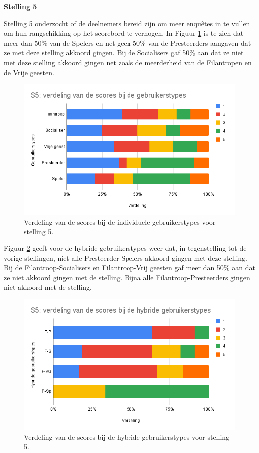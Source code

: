 \textbf{Stelling 5}

Stelling 5 onderzocht of de deelnemers bereid zijn om meer enquêtes in te vullen om hun rangschikking op het scorebord te verhogen. In Figuur \ref{fig:s5} is te zien dat meer dan 50\% van de Spelers en net geen 50\% van de Presteerders aangaven dat ze met deze stelling akkoord gingen. Bij de Socialisers gaf 50\% aan dat ze niet met deze stelling akkoord gingen net zoals de meerderheid van de Filantropen en de Vrije geesten.

\begin{figure}
    \includegraphics[width=\linewidth]{S5.png}
    \caption{Verdeling van de scores bij de individuele gebruikerstypes voor stelling 5.}
    \label{fig:s5}
\end{figure}

Figuur \ref{fig:s5_hybride} geeft voor de hybride gebruikerstypes weer dat, in tegenstelling tot de vorige stellingen, niet alle Presteerder-Spelers akkoord gingen met deze stelling. Bij de Filantroop-Socialisers en Filantroop-Vrij geesten gaf meer dan 50\% aan dat ze niet akkoord gingen met de stelling. Bijna alle Filantroop-Presteerders gingen niet akkoord met de stelling.

\begin{figure}
    \includegraphics[width=\linewidth]{S5_Hybride.png}
    \caption{Verdeling van de scores bij de hybride gebruikerstypes voor stelling 5.}
    \label{fig:s5_hybride}
\end{figure}

